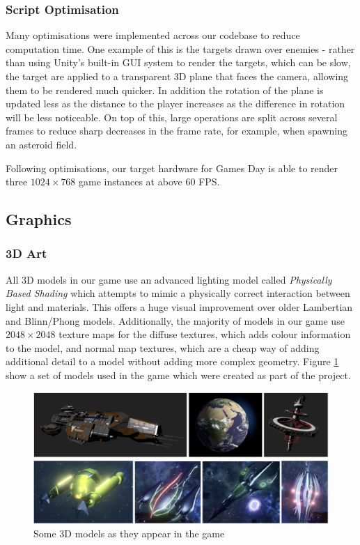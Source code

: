 \documentclass[a4paper,11pt]{article}
\begin{document}
\subsubsection{Script Optimisation}
Many optimisations were implemented across our codebase to reduce computation time. One example of this is the targets drawn over enemies - rather than using Unity’s built-in GUI system to render the targets, which can be slow, the target are applied to a transparent 3D plane that faces the camera, allowing them to be rendered much quicker. In addition the rotation of the plane is updated less as the distance to the player increases as the difference in rotation will be less noticeable. On top of this, large operations are split across several frames to reduce sharp decreases in the frame rate, for example, when spawning an asteroid field.

Following optimisations, our target hardware for Games Day is able to render three $1024 \times 768$ game instances at above 60 FPS.

\subsection{Graphics}

\subsubsection{3D Art}
All 3D models in our game use an advanced lighting model called \emph{Physically Based Shading} which attempts to mimic a physically correct interaction between light and materials. This offers a huge visual improvement over older Lambertian and Blinn/Phong models.  Additionally, the majority of models in our game use $2048 \times 2048$ texture maps for the diffuse textures, which adds colour information to the model, and normal map textures, which are a cheap way of adding additional detail to a model without adding more complex geometry. Figure \ref{fig:models} show a set of models used in the game which were created as part of the project.

\begin{figure}[ht]
	\centering
	\includegraphics[width=\textwidth]{images/3DArt}
    \caption{Some 3D models as they appear in the game}
    \label{fig:models}
\end{figure}
\end{document}
